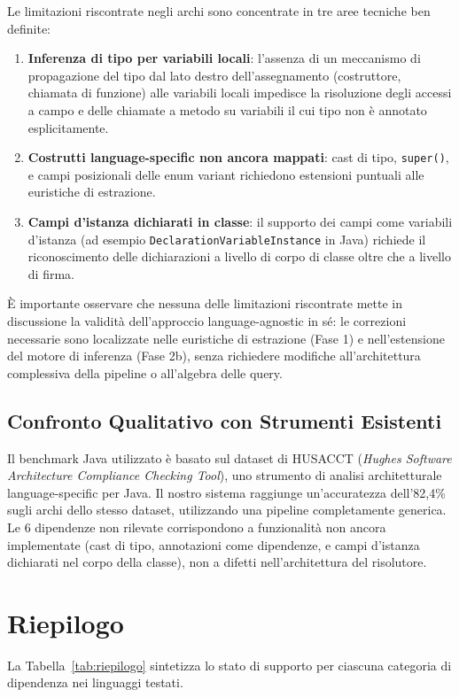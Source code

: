Le limitazioni riscontrate negli archi sono concentrate in tre aree
tecniche ben definite:
\begin{enumerate}
  \item \textbf{Inferenza di tipo per variabili locali}: l'assenza di
    un meccanismo di propagazione del tipo dal lato destro
    dell'assegnamento (costruttore, chiamata di funzione) alle
    variabili locali impedisce la risoluzione degli accessi a campo e
    delle chiamate a metodo su variabili il cui tipo non è annotato
    esplicitamente.
  \item \textbf{Costrutti language-specific non ancora mappati}: cast
    di tipo, \texttt{super()}, e campi posizionali delle enum variant
    richiedono estensioni puntuali alle euristiche di estrazione.
  \item \textbf{Campi d'istanza dichiarati in classe}: il supporto
    dei campi come variabili d'istanza (ad esempio
    \texttt{DeclarationVariableInstance} in Java) richiede il
    riconoscimento delle dichiarazioni a livello di corpo di classe
    oltre che a livello di firma.
\end{enumerate}

È importante osservare che nessuna delle limitazioni riscontrate mette
in discussione la validità dell'approccio language-agnostic in sé: le
correzioni necessarie sono localizzate nelle euristiche di estrazione
(Fase 1) e nell'estensione del motore di inferenza (Fase 2b), senza
richiedere modifiche all'architettura complessiva della pipeline o
all'algebra delle query.

\subsection{Confronto Qualitativo con Strumenti Esistenti}
Il benchmark Java utilizzato è basato sul dataset di HUSACCT
(\textit{Hughes Software Architecture Compliance Checking Tool}), uno
strumento di analisi architetturale language-specific per Java. Il
nostro sistema raggiunge un'accuratezza dell'82{,}4\% sugli archi
dello stesso dataset, utilizzando una pipeline completamente
generica. Le 6 dipendenze non rilevate corrispondono a funzionalità
non ancora implementate (cast di tipo, annotazioni come dipendenze, e
campi d'istanza dichiarati nel corpo della classe), non a difetti
nell'architettura del risolutore.

\section{Riepilogo}
La Tabella~\ref{tab:riepilogo} sintetizza lo stato di supporto per
ciascuna categoria di dipendenza nei linguaggi testati.

